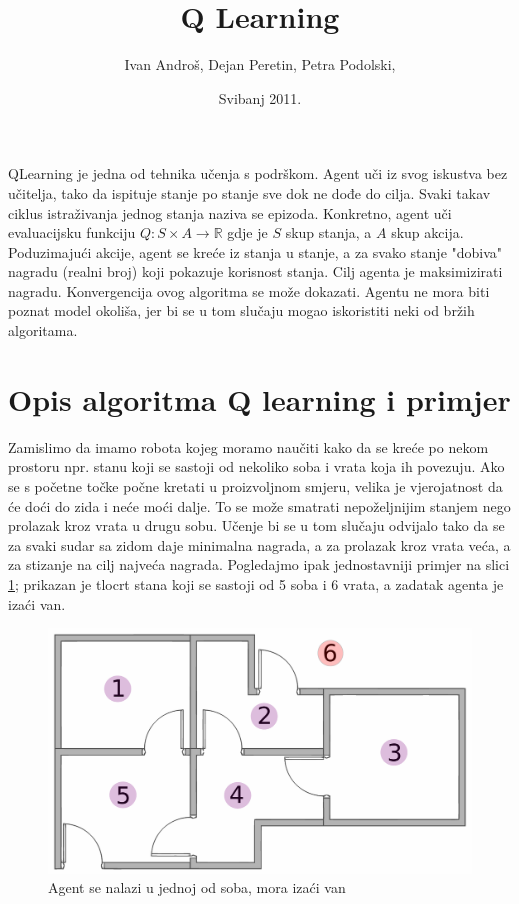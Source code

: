 \documentclass[    DIV=calc, paper=a4,fontsize=11pt, twocolumn]{scrartcl}                     %
\title{Q Learning}                                                    %
\author{Ivan Androš, Dejan Peretin, Petra Podolski, }                %
\date{Svibanj 2011.}
\newcommand{\initial}[1]{%
     \lettrine[lines=3,lhang=0.3,nindent=0em]{
                     \color{DarkGoldenrod}
                     {\textsf{#1}}}{}}
\begin{document}
\maketitle
\thispagestyle{fancy}                                                 %
\initial{Q}Learning je jedna od tehnika učenja s podrškom. Agent uči iz svog iskustva bez učitelja, tako da ispituje stanje po stanje sve dok ne dođe do cilja. Svaki takav ciklus istraživanja jednog stanja naziva se epizoda. Konkretno, agent uči evaluacijsku funkciju $Q:S\times A\to \mathbb{R}$ gdje je $S$ skup stanja, a $A$ skup akcija. Poduzimajući akcije, agent se kreće iz stanja u stanje, a za svako stanje "dobiva" nagradu (realni broj) koji pokazuje korisnost stanja. Cilj agenta je maksimizirati nagradu. Konvergencija ovog algoritma se može dokazati. Agentu ne mora biti poznat model okoliša, jer bi se u tom slučaju mogao iskoristiti neki od bržih algoritama.

\section*{Opis algoritma Q learning i primjer}
Zamislimo da imamo robota kojeg moramo naučiti kako da se kreće po nekom prostoru npr. stanu koji se sastoji od nekoliko soba i vrata koja ih povezuju. Ako se s početne točke počne kretati u proizvoljnom smjeru, velika je vjerojatnost da će do\'{c}i do zida i neće moći dalje. To se može smatrati nepoželjnijim stanjem nego prolazak kroz vrata u drugu sobu. Učenje bi se u tom slučaju odvijalo tako da se za svaki sudar sa zidom daje minimalna nagrada, a za prolazak kroz vrata veća, a za stizanje na cilj najveća nagrada. Pogledajmo ipak jednostavniji primjer na slici \ref{fig:1}; prikazan je tlocrt stana koji se sastoji od 5 soba i 6 vrata, a zadatak agenta je izaći van.

\begin{figure}
\centering
\includegraphics[scale=0.4]{slike/soba.pdf}
\caption{Agent se nalazi u jednoj od soba, mora izaći van}
\label{fig:1}
\end{figure}
\end{document}
